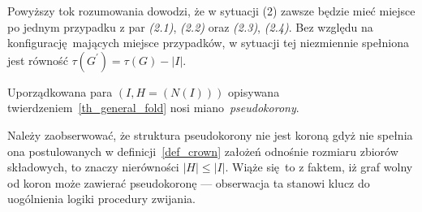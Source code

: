{\begin{bproof}
\begin{itemize}
      Powyższy tok rozumowania dowodzi, że w sytuacji (2) zawsze będzie mieć miejsce po jednym przypadku z par \textit{(2.1)}, \textit{(2.2)} oraz \textit{(2.3)}, \textit{(2.4)}.
      Bez względu na konfigurację mających miejsce przypadków, w sytuacji tej niezmiennie spełniona jest równość $\tau(G^\prime)=\tau(G)-|I|$.
    \end{itemize}
  \end{bproof}

  \begin{definition}
    Uporządkowana para $(I, H=(N(I)))$ opisywana twierdzeniem~\ref{th_general_fold} nosi miano~\emph{pseudokorony}.
  \end{definition}

  Należy zaobserwować, że struktura pseudokorony nie jest koroną gdyż nie spełnia ona postulowanych w definicji~\ref{def_crown} założeń odnośnie rozmiaru zbiorów składowych, to znaczy nierówności $|H| \leq |I|$.
  Wiąże się to z faktem, iż graf wolny od koron może zawierać pseudokoronę --- obserwacja ta stanowi klucz do uogólnienia logiki procedury zwijania.
}
